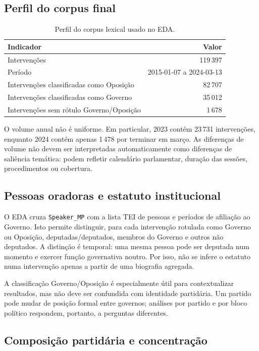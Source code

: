 \documentclass[11pt,a4paper]{article}
\begin{document}
\subsection{Perfil do corpus final}

\begin{table}[htbp]
\centering
\caption{Perfil do corpus lexical usado no EDA.}
\label{tab:perfil-corpus}
\begin{tabular}{lr}
\toprule
Indicador & Valor \\
\midrule
Intervenções & 119\,397 \\
Período & 2015-01-07 a 2024-03-13 \\
Intervenções classificadas como Oposição & 82\,707 \\
Intervenções classificadas como Governo & 35\,012 \\
Intervenções sem rótulo Governo/Oposição & 1\,678 \\
\bottomrule
\end{tabular}
\end{table}

O volume anual não é uniforme. Em particular, 2023 contém 23\,731 intervenções, enquanto 2024 contém apenas 1\,478 por terminar em março. As diferenças de volume não devem ser interpretadas automaticamente como diferenças de saliência temática: podem refletir calendário parlamentar, duração das sessões, procedimentos ou cobertura.

\subsection{Pessoas oradoras e estatuto institucional}

O EDA cruza \texttt{Speaker\_MP} com a lista TEI de pessoas e períodos de afiliação ao Governo. Isto permite distinguir, para cada intervenção rotulada como Governo ou Oposição, deputadas/deputados, membros do Governo e outros não deputados. A distinção é temporal: uma mesma pessoa pode ser deputada num momento e exercer função governativa noutro. Por isso, não se infere o estatuto numa intervenção apenas a partir de uma biografia agregada.

A classificação Governo/Oposição é especialmente útil para contextualizar resultados, mas não deve ser confundida com identidade partidária. Um partido pode mudar de posição formal entre governos; análises por partido e por bloco político respondem, portanto, a perguntas diferentes.

\subsection{Composição partidária e concentração}
\end{document}
